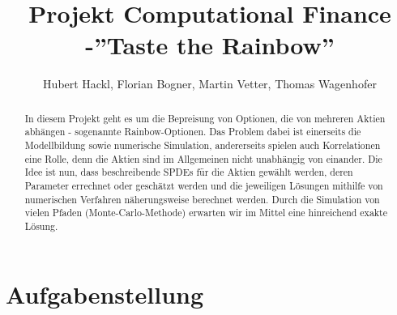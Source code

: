 \documentclass[12pt]{article}
\title{Projekt Computational Finance -''Taste the Rainbow''}
\author{Hubert Hackl, Florian Bogner, Martin Vetter, Thomas Wagenhofer}
\begin{document}
	
	\maketitle
	
	\begin{abstract}
		In diesem Projekt geht es um die Bepreisung von Optionen, die von mehreren Aktien abhängen - sogenannte Rainbow-Optionen. Das Problem dabei ist einerseits die Modellbildung sowie numerische Simulation, andererseits spielen auch Korrelationen eine Rolle, denn die Aktien sind im Allgemeinen nicht unabhängig von einander. Die Idee ist nun, dass beschreibende SPDEs für die Aktien gewählt werden, deren Parameter errechnet oder geschätzt werden und die jeweiligen Lösungen mithilfe von numerischen Verfahren näherungsweise berechnet werden. Durch die Simulation von vielen Pfaden (Monte-Carlo-Methode) erwarten wir im Mittel eine hinreichend exakte Lösung.
	\end{abstract}
	
	
	\section*{Aufgabenstellung}
	
\end{document}
